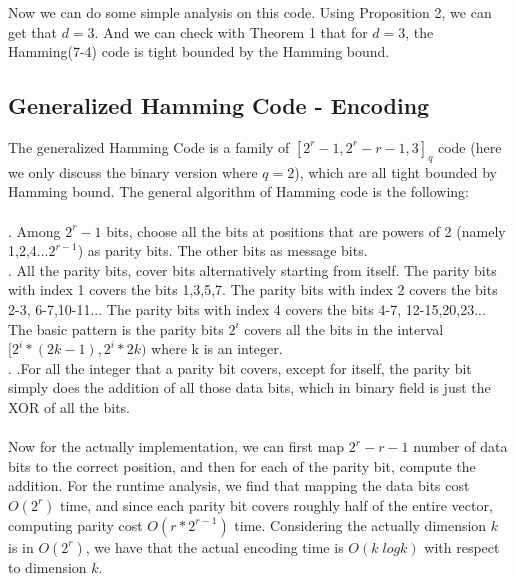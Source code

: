 \documentclass{article}
\begin{document}
Now we can do some simple analysis on this code. Using Proposition 2, we can get that $d = 3$. And we can check with Theorem 1 that for $d=3$, the Hamming(7-4) code is tight bounded by the Hamming bound.
\subsection{Generalized Hamming Code - Encoding}
The generalized Hamming Code is a family of $[2^r-1, 2^r-r-1,3]_q$ code (here we only discuss the binary version where $q=2$), which are all tight bounded by Hamming bound. The general algorithm of Hamming code is the following:\\\\
. \quad Among $2^r-1$ bits, choose all the bits at positions that are powers of 2 (namely 1,2,4...$2^{r-1}$) as parity bits. The other bits as message bits.\\
. \quad All the parity bits, cover bits alternatively starting from itself. The parity bits with index 1 covers the bits 1,3,5,7. The parity bits with index 2 covers the bits 2-3, 6-7,10-11... The parity bits with index 4 covers the bits 4-7, 12-15,20,23... The basic pattern is the parity bits $2^i$ covers all the bits in the interval $[2^i*(2k-1), 2^i*2k )$ where k is an integer.\\
. \quad .For all the integer that a parity bit covers, except for itself, the parity bit simply does the addition of all those data bits, which in binary field is just the XOR of all the bits.\\\\
Now for the actually implementation, we can first map $2^r-r-1$ number of data bits to the correct position, and then for each of the parity bit, compute the addition. For the runtime analysis, we find that mapping the data bits cost $O(2^r)$ time, and since each parity bit covers roughly half of the entire vector, computing parity cost $O(r*2^{r-1})$ time. Considering the actually dimension $k$ is in $O(2^r)$, we have that the actual encoding time is $O(k \;logk)$ with respect to dimension $k$.
\end{document}
